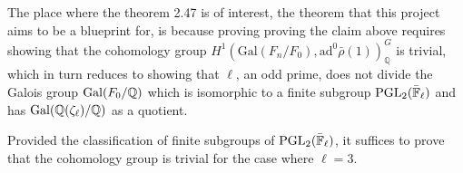 The place where the theorem 2.47 is of interest, the theorem that this project aims to be a blueprint for, is because proving proving the claim above requires showing that the 
cohomology group  $H^1(\textrm{Gal}(F_n / F_0), \textrm{ad}^0\bar{\rho}(1))^G_{\mathbb{Q}}$ is trivial, which in turn reduces to showing that $\ell$, an odd prime, does not divide the Galois group $\operatorname{Gal}(F_0 /\mathbb{Q})$ which is isomorphic to a finite subgroup $\operatorname{PGL}_2(\bar{\mathbb{F}}_\ell)$
and has $\operatorname{Gal}(\mathbb{Q}(\zeta_\ell)/\mathbb{Q})$ as a quotient.

Provided the classification of finite subgroups of $\operatorname{PGL}_2(\bar{\mathbb{F}}_\ell)$, it suffices to prove that the cohomology group is trivial for the case where $\ell = 3$.




    










